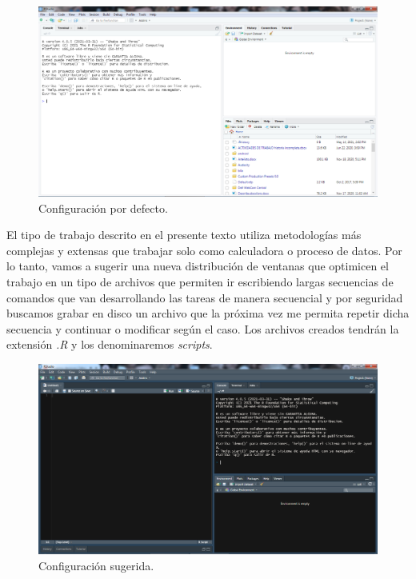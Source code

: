\documentclass[
]{book}
\begin{document}
\begin{figure}

{\centering \includegraphics[width=18.97in]{img/GUI} 

}

\caption{Configuración por defecto.}\label{fig:img-gui}
\end{figure}

El tipo de trabajo descrito en el presente texto utiliza metodologías más complejas y extensas que trabajar solo como calculadora o proceso de datos. Por lo tanto, vamos a sugerir una nueva distribución de ventanas que optimicen el trabajo en un tipo de archivos que permiten ir escribiendo largas secuencias de comandos que van desarrollando las tareas de manera secuencial y por seguridad buscamos grabar en disco un archivo que la próxima vez me permita repetir dicha secuencia y continuar o modificar según el caso. Los archivos creados tendrán la extensión \emph{.R} y los denominaremos \emph{scripts}.

\begin{figure}

{\centering \includegraphics[width=18.97in]{img/gui-final} 

}

\caption{Configuración sugerida.}\label{fig:img-gui-1}
\end{figure}
\end{document}
